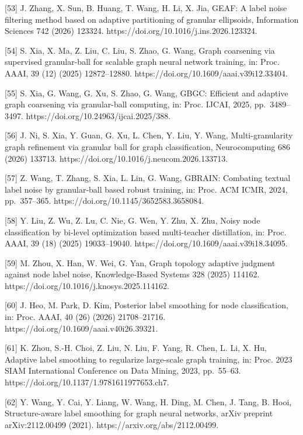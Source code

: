 {[}53{]} J. Zhang, X. Sun, B. Huang, T. Wang, H. Li, X. Jia, GEAF: A label noise filtering method based on adaptive partitioning of granular ellipsoids, Information Sciences 742 (2026) 123324. https://doi.org/10.1016/j.ins.2026.123324.

{[}54{]} S. Xia, X. Ma, Z. Liu, C. Liu, S. Zhao, G. Wang, Graph coarsening via supervised granular-ball for scalable graph neural network training, in: Proc. AAAI, 39 (12) (2025) 12872--12880. https://doi.org/10.1609/aaai.v39i12.33404.

{[}55{]} S. Xia, G. Wang, G. Xu, S. Zhao, G. Wang, GBGC: Efficient and adaptive graph coarsening via granular-ball computing, in: Proc. IJCAI, 2025, pp.~3489--3497. https://doi.org/10.24963/ijcai.2025/388.

{[}56{]} J. Ni, S. Xia, Y. Guan, G. Xu, L. Chen, Y. Liu, Y. Wang, Multi-granularity graph refinement via granular ball for graph classification, Neurocomputing 686 (2026) 133713. https://doi.org/10.1016/j.neucom.2026.133713.

{[}57{]} Z. Wang, T. Zhang, S. Xia, L. Lin, G. Wang, GBRAIN: Combating textual label noise by granular-ball based robust training, in: Proc. ACM ICMR, 2024, pp.~357--365. https://doi.org/10.1145/3652583.3658084.

{[}58{]} Y. Liu, Z. Wu, Z. Lu, C. Nie, G. Wen, Y. Zhu, X. Zhu, Noisy node classification by bi-level optimization based multi-teacher distillation, in: Proc. AAAI, 39 (18) (2025) 19033--19040. https://doi.org/10.1609/aaai.v39i18.34095.

{[}59{]} M. Zhou, X. Han, W. Wei, G. Yan, Graph topology adaptive judgment against node label noise, Knowledge-Based Systems 328 (2025) 114162. https://doi.org/10.1016/j.knosys.2025.114162.

{[}60{]} J. Heo, M. Park, D. Kim, Posterior label smoothing for node classification, in: Proc. AAAI, 40 (26) (2026) 21708--21716. https://doi.org/10.1609/aaai.v40i26.39321.

{[}61{]} K. Zhou, S.-H. Choi, Z. Liu, N. Liu, F. Yang, R. Chen, L. Li, X. Hu, Adaptive label smoothing to regularize large-scale graph training, in: Proc. 2023 SIAM International Conference on Data Mining, 2023, pp.~55--63. https://doi.org/10.1137/1.9781611977653.ch7.

{[}62{]} Y. Wang, Y. Cai, Y. Liang, W. Wang, H. Ding, M. Chen, J. Tang, B. Hooi, Structure-aware label smoothing for graph neural networks, arXiv preprint arXiv:2112.00499 (2021). https://arxiv.org/abs/2112.00499.

